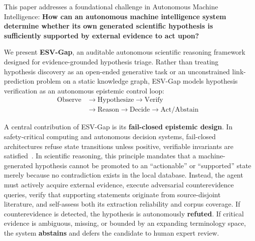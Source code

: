 \documentclass[conference,10pt]{IEEEtran}
\newcommand{\method}{ESV-Gap}
\begin{document}
This paper addresses a foundational challenge in Autonomous Machine Intelligence: \textbf{How can an autonomous machine intelligence system determine whether its own generated scientific hypothesis is sufficiently supported by external evidence to act upon?}

We present \textbf{\method{}}, an auditable autonomous scientific reasoning framework designed for evidence-grounded hypothesis triage. Rather than treating hypothesis discovery as an open-ended generative task or an unconstrained link-prediction problem on a static knowledge graph, \method{} models hypothesis verification as an autonomous epistemic control loop:
\begin{equation}
\begin{aligned}
\text{Observe} &\rightarrow \text{Hypothesize} \rightarrow \text{Verify} \\
&\rightarrow \text{Reason} \rightarrow \text{Decide} \rightarrow \text{Act/Abstain}
\end{aligned}
\end{equation}

A central contribution of \method{} is its \textbf{fail-closed epistemic design}. In safety-critical computing and autonomous decision systems, fail-closed architectures refuse state transitions unless positive, verifiable invariants are satisfied~\cite{saltzer1975protection}. In scientific reasoning, this principle mandates that a machine-generated hypothesis cannot be promoted to an ``actionable'' or ``supported'' state merely because no contradiction exists in the local database. Instead, the agent must actively acquire external evidence, execute adversarial counterevidence queries, verify that supporting statements originate from source-disjoint literature, and self-assess both its extraction reliability and corpus coverage. If counterevidence is detected, the hypothesis is autonomously \textbf{refuted}. If critical evidence is ambiguous, missing, or bounded by an expanding terminology space, the system \textbf{abstains} and defers the candidate to human expert review.
\end{document}

